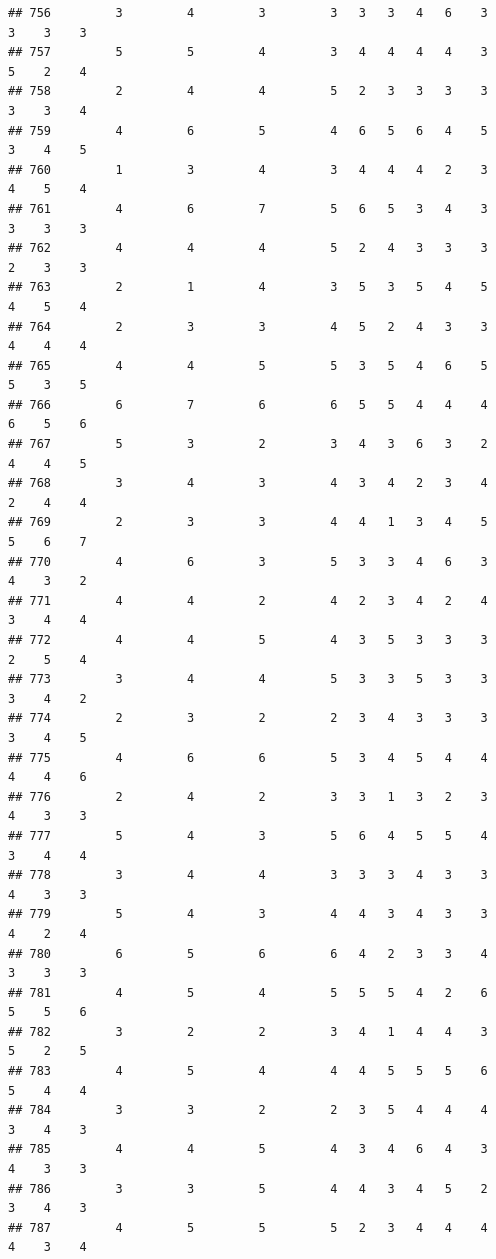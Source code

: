 \documentclass[
]{article}
\begin{document}
\begin{verbatim}
## 756         3         4         3         3   3   3   4   6    3    3    3    3
## 757         5         5         4         3   4   4   4   4    3    5    2    4
## 758         2         4         4         5   2   3   3   3    3    3    3    4
## 759         4         6         5         4   6   5   6   4    5    3    4    5
## 760         1         3         4         3   4   4   4   2    3    4    5    4
## 761         4         6         7         5   6   5   3   4    3    3    3    3
## 762         4         4         4         5   2   4   3   3    3    2    3    3
## 763         2         1         4         3   5   3   5   4    5    4    5    4
## 764         2         3         3         4   5   2   4   3    3    4    4    4
## 765         4         4         5         5   3   5   4   6    5    5    3    5
## 766         6         7         6         6   5   5   4   4    4    6    5    6
## 767         5         3         2         3   4   3   6   3    2    4    4    5
## 768         3         4         3         4   3   4   2   3    4    2    4    4
## 769         2         3         3         4   4   1   3   4    5    5    6    7
## 770         4         6         3         5   3   3   4   6    3    4    3    2
## 771         4         4         2         4   2   3   4   2    4    3    4    4
## 772         4         4         5         4   3   5   3   3    3    2    5    4
## 773         3         4         4         5   3   3   5   3    3    3    4    2
## 774         2         3         2         2   3   4   3   3    3    3    4    5
## 775         4         6         6         5   3   4   5   4    4    4    4    6
## 776         2         4         2         3   3   1   3   2    3    4    3    3
## 777         5         4         3         5   6   4   5   5    4    3    4    4
## 778         3         4         4         3   3   3   4   3    3    4    3    3
## 779         5         4         3         4   4   3   4   3    3    4    2    4
## 780         6         5         6         6   4   2   3   3    4    3    3    3
## 781         4         5         4         5   5   5   4   2    6    5    5    6
## 782         3         2         2         3   4   1   4   4    3    5    2    5
## 783         4         5         4         4   4   5   5   5    6    5    4    4
## 784         3         3         2         2   3   5   4   4    4    3    4    3
## 785         4         4         5         4   3   4   6   4    3    4    3    3
## 786         3         3         5         4   4   3   4   5    2    3    4    3
## 787         4         5         5         5   2   3   4   4    4    4    3    4

\end{verbatim}
\end{document}
